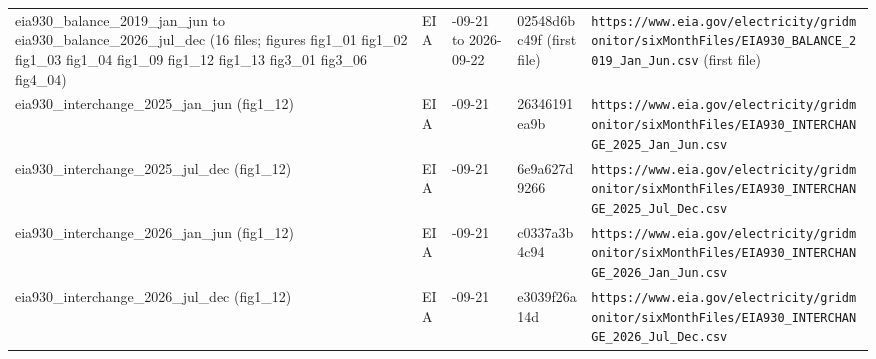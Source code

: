 \begin{longtable}{>{\raggedright\arraybackslash}p{3.0cm}>{\raggedright\arraybackslash}p{1.5cm}>{\raggedright\arraybackslash}p{1.4cm}>{\raggedright\arraybackslash}p{2.0cm}>{\raggedright\arraybackslash}p{6.0cm}}
eia930\_\allowbreak{}balance\_\allowbreak{}2019\_\allowbreak{}jan\_\allowbreak{}jun to eia930\_\allowbreak{}balance\_\allowbreak{}2026\_\allowbreak{}jul\_\allowbreak{}dec (16 files; figures fig1\_\allowbreak{}01 fig1\_\allowbreak{}02 fig1\_\allowbreak{}03 fig1\_\allowbreak{}04 fig1\_\allowbreak{}09 fig1\_\allowbreak{}12 fig1\_\allowbreak{}13 fig3\_\allowbreak{}01 fig3\_\allowbreak{}06 fig4\_\allowbreak{}04) & EIA & 2026-09-21 to 2026-09-22 & 02548d6bc49f (first file) & \texttt{https:\allowbreak{}/\allowbreak{}/\allowbreak{}www.\allowbreak{}eia.\allowbreak{}gov/\allowbreak{}electricity/\allowbreak{}gridmonitor/\allowbreak{}sixMonthFiles/\allowbreak{}EIA930\_\allowbreak{}BALANCE\_\allowbreak{}2019\_\allowbreak{}Jan\_\allowbreak{}Jun.\allowbreak{}csv} (first file) \\
eia930\_\allowbreak{}interchange\_\allowbreak{}2025\_\allowbreak{}jan\_\allowbreak{}jun (fig1\_\allowbreak{}12) & EIA & 2026-09-21 & 26346191ea9b & \texttt{https:\allowbreak{}/\allowbreak{}/\allowbreak{}www.\allowbreak{}eia.\allowbreak{}gov/\allowbreak{}electricity/\allowbreak{}gridmonitor/\allowbreak{}sixMonthFiles/\allowbreak{}EIA930\_\allowbreak{}INTERCHANGE\_\allowbreak{}2025\_\allowbreak{}Jan\_\allowbreak{}Jun.\allowbreak{}csv} \\
eia930\_\allowbreak{}interchange\_\allowbreak{}2025\_\allowbreak{}jul\_\allowbreak{}dec (fig1\_\allowbreak{}12) & EIA & 2026-09-21 & 6e9a627d9266 & \texttt{https:\allowbreak{}/\allowbreak{}/\allowbreak{}www.\allowbreak{}eia.\allowbreak{}gov/\allowbreak{}electricity/\allowbreak{}gridmonitor/\allowbreak{}sixMonthFiles/\allowbreak{}EIA930\_\allowbreak{}INTERCHANGE\_\allowbreak{}2025\_\allowbreak{}Jul\_\allowbreak{}Dec.\allowbreak{}csv} \\
eia930\_\allowbreak{}interchange\_\allowbreak{}2026\_\allowbreak{}jan\_\allowbreak{}jun (fig1\_\allowbreak{}12) & EIA & 2026-09-21 & c0337a3b4c94 & \texttt{https:\allowbreak{}/\allowbreak{}/\allowbreak{}www.\allowbreak{}eia.\allowbreak{}gov/\allowbreak{}electricity/\allowbreak{}gridmonitor/\allowbreak{}sixMonthFiles/\allowbreak{}EIA930\_\allowbreak{}INTERCHANGE\_\allowbreak{}2026\_\allowbreak{}Jan\_\allowbreak{}Jun.\allowbreak{}csv} \\
eia930\_\allowbreak{}interchange\_\allowbreak{}2026\_\allowbreak{}jul\_\allowbreak{}dec (fig1\_\allowbreak{}12) & EIA & 2026-09-21 & e3039f26a14d & \texttt{https:\allowbreak{}/\allowbreak{}/\allowbreak{}www.\allowbreak{}eia.\allowbreak{}gov/\allowbreak{}electricity/\allowbreak{}gridmonitor/\allowbreak{}sixMonthFiles/\allowbreak{}EIA930\_\allowbreak{}INTERCHANGE\_\allowbreak{}2026\_\allowbreak{}Jul\_\allowbreak{}Dec.\allowbreak{}csv} \\

\end{longtable}

